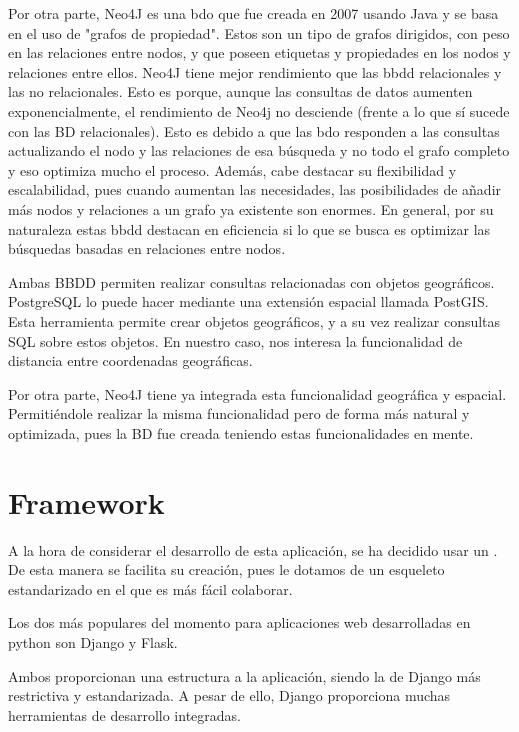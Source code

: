     Por otra parte, Neo4J es una \ac{bdo} que fue creada en 2007 usando Java y se basa en el uso de "grafos de propiedad". Estos son un tipo de grafos dirigidos, con peso en las relaciones entre nodos, y que poseen etiquetas y propiedades en los nodos y relaciones entre ellos. Neo4J tiene mejor rendimiento que las \ac{bbdd} relacionales y las no relacionales. Esto es porque, aunque las consultas de datos aumenten exponencialmente, el rendimiento de Neo4j no desciende (frente a lo que sí sucede con las BD relacionales). Esto es debido a que las \ac{bdo} responden a las consultas actualizando el nodo y las relaciones de esa búsqueda y no todo el grafo completo y eso optimiza mucho el proceso.
    Además, cabe destacar su flexibilidad y escalabilidad, pues cuando aumentan las necesidades, las posibilidades de añadir más nodos y relaciones a un grafo ya existente son enormes.
    En general, por su naturaleza estas \ac{bbdd} destacan en eficiencia si lo que se busca es optimizar las búsquedas basadas en relaciones entre nodos. 
    
    Ambas BBDD permiten realizar consultas relacionadas con objetos geográficos.    
    PostgreSQL lo puede hacer mediante una extensión espacial llamada PostGIS\cite{postgis}. Esta herramienta permite crear objetos geográficos, y a su vez realizar consultas SQL sobre estos objetos. En nuestro caso, nos interesa la funcionalidad de distancia entre coordenadas geográficas.
    
    Por otra parte, Neo4J tiene ya integrada esta funcionalidad geográfica y espacial. Permitiéndole realizar la misma funcionalidad pero de forma más natural y optimizada, pues la BD fue creada teniendo estas funcionalidades en mente.
    
  \section{Framework}
    A la hora de considerar el desarrollo de esta aplicación, se ha decidido usar un . De esta manera se facilita su creación, pues le dotamos de un esqueleto estandarizado en el que es más fácil colaborar.
    
    Los dos  más populares del momento para aplicaciones web desarrolladas en python son Django\cite{django} y Flask\cite{flask}.
    
    Ambos proporcionan una estructura a la aplicación, siendo la de Django más restrictiva y estandarizada. A pesar de ello, Django proporciona muchas herramientas de desarrollo integradas.
    
